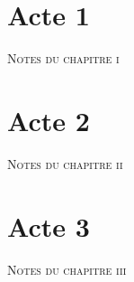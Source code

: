 \chapter{Acte 1}


\ifdefined\AVECNOTES
  \cleardoublepage
  {\centering\normalfont\scshape\large Notes du chapitre \textsc{i}\par}
  \vspace{\onelineskip}
  \begingroup\parindent=0pt
  \theendnotes
  \endgroup
\fi

\chapter{Acte 2}


\ifdefined\AVECNOTES
  \cleardoublepage
  {\centering\normalfont\scshape\large Notes du chapitre \textsc{ii}\par}
  \vspace{\onelineskip}
  \begingroup\parindent=0pt
  \theendnotes
  \endgroup
\fi

\chapter{Acte 3}


\ifdefined\AVECNOTES
  \cleardoublepage
  {\centering\normalfont\scshape\large Notes du chapitre \textsc{iii}\par}
  \vspace{\onelineskip}
  \begingroup\parindent=0pt
  \theendnotes
  \endgroup
\fi
